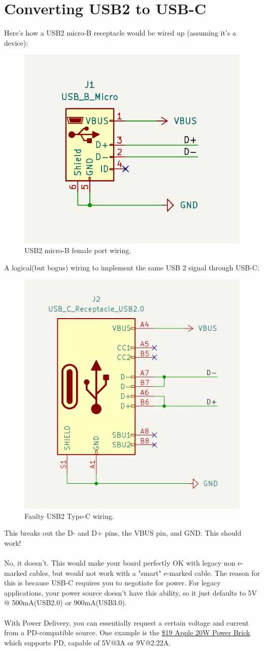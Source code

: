 \documentclass[12pt]{article}
\begin{document}
\section{Converting USB2 to USB-C}
Here's how a USB2 micro-B receptacle would be wired up (assuming it's a device):

\begin{figure}[h]
	\centering
	\includegraphics[width=0.43\linewidth]{USB-micro-B.png}
	\caption{USB2 micro-B female port wiring.}
	\label{fig:usb2_microB}
\end{figure}

A logical(but bogus) wiring to implement the same USB 2 signal through USB-C:

\begin{figure}[h]
	\centering
	\includegraphics[width=0.43\linewidth]{USB-faulty-type-C.png}
	\caption{Faulty USB2 Type-C wiring.}
	\label{fig:usb2_faulty_usbc}
\end{figure} 

\noindent 
This breaks out the D- and D+ pins, the VBUS pin, and GND. This should work!\\\\
\noindent
No, it doesn't. This would make your board perfectly OK with legacy non e-marked cables, but would not work with a "smart" e-marked cable. The reason for this is because USB-C requires you to negotiate for power. For legacy applications, your power source doesn't have this ability, so it just defaults to 5V @ 500mA(USB2.0) or 900mA(USB3.0). \\\\
\noindent
With Power Delivery, you can essentially request a certain voltage and current from a PD-compatible source. One example is the \href{https://www.apple.com/shop/product/MHJA3AM/A/20w-usb-c-power-adapter}{\$19 Apple 20W Power Brick} which supports PD, capable of 5V@3A or 9V@2.22A. 
\end{document}
